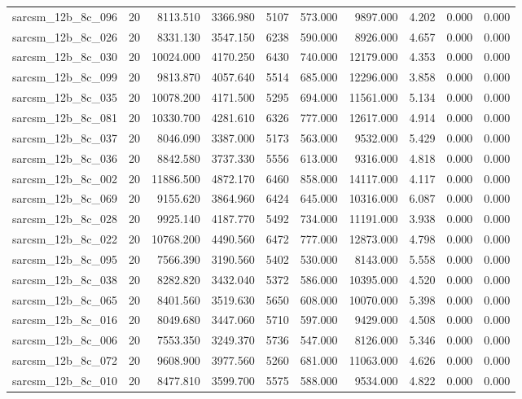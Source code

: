 \begin{tabular}{lrrrrrrrrr}
sarcsm\_12b\_8c\_096 & 20 & 8113.510 & 3366.980 & 5107 & 573.000 & 9897.000 & 4.202 & 0.000 & 0.000 \\
sarcsm\_12b\_8c\_026 & 20 & 8331.130 & 3547.150 & 6238 & 590.000 & 8926.000 & 4.657 & 0.000 & 0.000 \\
sarcsm\_12b\_8c\_030 & 20 & 10024.000 & 4170.250 & 6430 & 740.000 & 12179.000 & 4.353 & 0.000 & 0.000 \\
sarcsm\_12b\_8c\_099 & 20 & 9813.870 & 4057.640 & 5514 & 685.000 & 12296.000 & 3.858 & 0.000 & 0.000 \\
sarcsm\_12b\_8c\_035 & 20 & 10078.200 & 4171.500 & 5295 & 694.000 & 11561.000 & 5.134 & 0.000 & 0.000 \\
sarcsm\_12b\_8c\_081 & 20 & 10330.700 & 4281.610 & 6326 & 777.000 & 12617.000 & 4.914 & 0.000 & 0.000 \\
sarcsm\_12b\_8c\_037 & 20 & 8046.090 & 3387.000 & 5173 & 563.000 & 9532.000 & 5.429 & 0.000 & 0.000 \\
sarcsm\_12b\_8c\_036 & 20 & 8842.580 & 3737.330 & 5556 & 613.000 & 9316.000 & 4.818 & 0.000 & 0.000 \\
sarcsm\_12b\_8c\_002 & 20 & 11886.500 & 4872.170 & 6460 & 858.000 & 14117.000 & 4.117 & 0.000 & 0.000 \\
sarcsm\_12b\_8c\_069 & 20 & 9155.620 & 3864.960 & 6424 & 645.000 & 10316.000 & 6.087 & 0.000 & 0.000 \\
sarcsm\_12b\_8c\_028 & 20 & 9925.140 & 4187.770 & 5492 & 734.000 & 11191.000 & 3.938 & 0.000 & 0.000 \\
sarcsm\_12b\_8c\_022 & 20 & 10768.200 & 4490.560 & 6472 & 777.000 & 12873.000 & 4.798 & 0.000 & 0.000 \\
sarcsm\_12b\_8c\_095 & 20 & 7566.390 & 3190.560 & 5402 & 530.000 & 8143.000 & 5.558 & 0.000 & 0.000 \\
sarcsm\_12b\_8c\_038 & 20 & 8282.820 & 3432.040 & 5372 & 586.000 & 10395.000 & 4.520 & 0.000 & 0.000 \\
sarcsm\_12b\_8c\_065 & 20 & 8401.560 & 3519.630 & 5650 & 608.000 & 10070.000 & 5.398 & 0.000 & 0.000 \\
sarcsm\_12b\_8c\_016 & 20 & 8049.680 & 3447.060 & 5710 & 597.000 & 9429.000 & 4.508 & 0.000 & 0.000 \\
sarcsm\_12b\_8c\_006 & 20 & 7553.350 & 3249.370 & 5736 & 547.000 & 8126.000 & 5.346 & 0.000 & 0.000 \\
sarcsm\_12b\_8c\_072 & 20 & 9608.900 & 3977.560 & 5260 & 681.000 & 11063.000 & 4.626 & 0.000 & 0.000 \\
sarcsm\_12b\_8c\_010 & 20 & 8477.810 & 3599.700 & 5575 & 588.000 & 9534.000 & 4.822 & 0.000 & 0.000 \\

\end{tabular}
